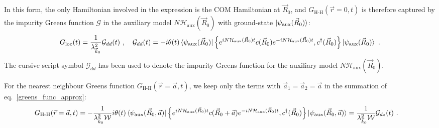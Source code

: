 \documentclass{report}
\numberwithin{equation}{section}
\begin{document}
In this form, the only Hamiltonian involved in the expression is the COM Hamiltonian at \(\vec R_0\), and \(G_\text{H-H}(\vec r=0, t)\) is therefore captured by the impurity Greens function \(\mathcal{G}\) in the auxiliary model \(N \mathcal{H}_\text{aux}(\vec R_0)\) with ground-state \(\ket{\psi_\text{aux}(\vec R_0)}\):
\begin{equation}\begin{aligned}
	\label{greens_func_relation}
	G_\text{loc}(t) = \frac{1}{\lambda_{\vec k_0}^2}\mathcal{G}_{dd}(t)~,\quad \mathcal{G}_{dd}(t) = -i\theta(t) \braket{\psi_\text{aux}(\vec R_0) | \left\{ e^{i N \mathcal{H}_\text{aux}(\vec R_0) t}c(\vec R_0)e^{-i N \mathcal{H}_\text{aux}(\vec R_0) t}, c^\dagger(\vec R_0) \right\} | \psi_\text{aux}(\vec R_0)}~.
\end{aligned}\end{equation}
The cursive script symbol \(\mathcal{G}_{dd}\) has been used to denote the impurity Greens function for the auxiliary model \(N \mathcal{H}_\text{aux}(\vec R_0)\).

For the nearest neighbour Greens function \(G_\text{H-H}(\vec r=\vec a, t)\), we keep only the terms with \(\vec a_1 = \vec a_2 = \vec a\) in the summation of eq.~\ref{greens_func_approx}:
\begin{equation}\begin{aligned}
	G_\text{H-H}(\vec r=\vec a, t) &= -\frac{1}{\lambda_{\vec k_0}^2 \mathcal{W}}i\theta(t) \braket{\psi_\text{aux}(\vec R_0, \vec a) | \left\{ e^{i N \mathcal{H}_\text{aux}(\vec R_0) t}c(\vec R_0 + \vec a)e^{-i N \mathcal{H}_\text{aux}(\vec R_0) t}, c^\dagger(\vec R_0) \right\} | \psi_\text{aux}(\vec R_0, \vec a)} = \frac{1}{\lambda_{\vec k_0}^2 \mathcal{W}} \mathcal{G}_{dz}(t)~.
\end{aligned}\end{equation}
\end{document}
